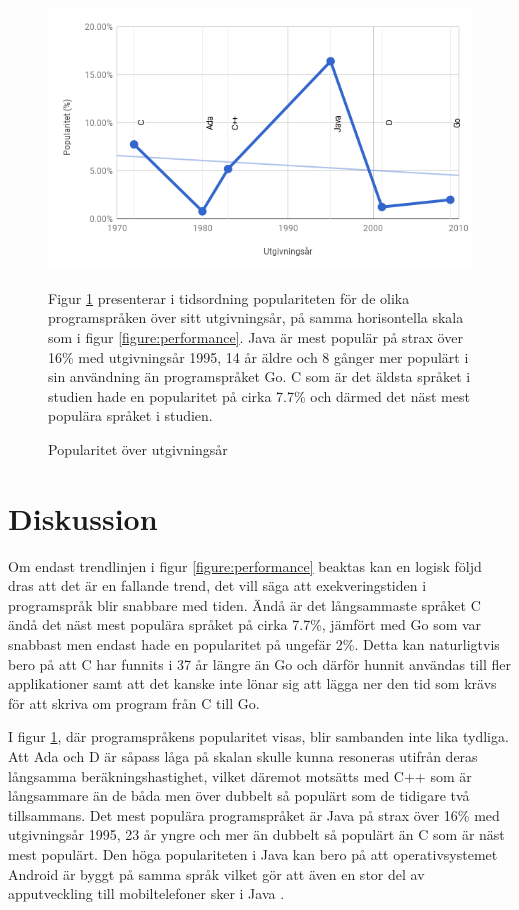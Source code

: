 \documentclass[12pt,swedish]{article}
\begin{document}
\begin{figure}[H]
\begin{center}
\includegraphics[width=1\textwidth,natwidth=600,natheight=371]{popularity.png}
\caption{Popularitet över utgivningsår}
\label{figure:popularity}
\end{center}
Figur \ref{figure:popularity} presenterar i tidsordning populariteten för de olika programspråken över sitt utgivningsår, på samma horisontella skala som i figur \ref{figure:performance}. Java är mest populär på strax över 16\% med utgivningsår 1995, 14 år äldre och 8 gånger mer populärt i sin användning än programspråket Go. C som är det äldsta språket i studien hade en popularitet på cirka 7.7\% och därmed det näst mest populära språket i studien.
\end{figure}


\section{Diskussion}
Om endast trendlinjen i figur \ref{figure:performance} beaktas kan en logisk följd dras att det är en fallande trend, det vill säga att exekveringstiden i programspråk blir snabbare med tiden. Ändå är det långsammaste språket C ändå det näst mest populära språket på cirka 7.7\%, jämfört med Go som var snabbast men endast hade en popularitet på ungefär 2\%. Detta kan naturligtvis bero på att C har funnits i 37 år längre än Go och därför hunnit användas till fler applikationer samt att det kanske inte lönar sig att lägga ner den tid som krävs för att skriva om program från C till Go.

I figur \ref{figure:popularity}, där programspråkens popularitet visas, blir sambanden inte lika tydliga. Att Ada och D är såpass låga på skalan skulle kunna resoneras utifrån  deras långsamma beräkningshastighet, vilket däremot motsätts med C++ som är långsammare än de båda men över dubbelt så populärt som de tidigare två tillsammans. Det mest populära programspråket är Java på strax över 16\% med utgivningsår 1995, 23 år yngre och mer än dubbelt så populärt än C som är näst mest populärt. Den höga populariteten i Java kan bero på att operativsystemet Android är byggt på samma språk vilket gör att även en stor del av apputveckling till mobiltelefoner sker i Java \citep{gruman_2017}.
\end{document}
